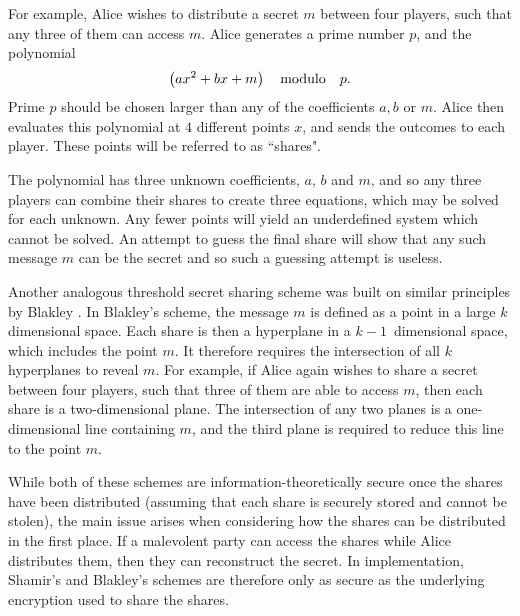 For example, Alice wishes to distribute a secret $m$ between four players, such that any three of them can access $m$. Alice generates a prime number $p$, and the polynomial 
\begin{equation}
\left( a x^2 + b x + m \right) \qq{modulo} p.
\end{equation}
Prime $p$ should be chosen larger than any of the coefficients $a, b$ or $m$. Alice then evaluates this polynomial at $4$ different points $x$, and sends the outcomes to each player. These points will be referred to as ``shares". %

The polynomial has three unknown coefficients, $a$, $b$ and $m$, and so any three players can combine their shares to create three equations, which may be solved for each unknown. Any fewer points will yield an underdefined system which cannot be solved. An attempt to guess the final share will show that any such message $m$ can be the secret and so such a guessing attempt is useless.

Another analogous threshold secret sharing scheme was built on similar principles by Blakley \cite{Blakley1979}. In Blakley's scheme, the message $m$ is defined as a point in a large $k$ dimensional space. Each share is then a hyperplane in a $k-1$~dimensional space, which includes the point $m$. It therefore requires the intersection of all $k$ hyperplanes to reveal $m$. For example, if Alice again wishes to share a secret between four players, such that three of them are able to access $m$, then each share is a two-dimensional plane. The intersection of any two planes is a one-dimensional line containing $m$, and the third plane is required to reduce this line to the point $m$.

While both of these schemes are information-theoretically secure once the shares have been distributed (assuming that each share is securely stored and cannot be stolen), the main issue arises when considering how the shares can be distributed in the first place. If a malevolent party can access the shares while Alice distributes them, then they can reconstruct the secret. In implementation, Shamir's and Blakley's schemes are therefore only as secure as the underlying encryption used to share the shares.

%

